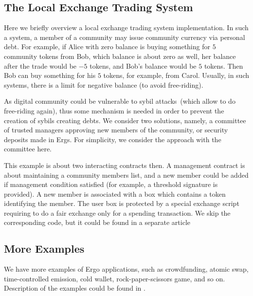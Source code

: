 
\subsection{The Local Exchange Trading System}
 \label{sec:platform}


 Here we briefly overview a local exchange trading system implementation. In such a system, a member of a community may
 issue community currency via personal debt. For example, if Alice with zero balance is buying something for $5$
 community tokens from Bob, which balance is about zero as well, her balance after the trade would be $-5$ tokens, and
 Bob's balance would be $5$ tokens. Then Bob can buy something for his $5$ tokens, for example, from Carol.
 Usually, in such systems, there is a limit for negative balance (to avoid free-riding).

 As digital community could be vulnerable to sybil attacks~(which allow to do free-riding again), thus some mechanism
 is needed in order to prevent the creation of sybils creating debts. We consider two solutions, namely, a committee of
 trusted managers approving new members of the community, or security deposits made in Ergs. For simplicity, we
 consider the approach with the committee here.

 This example is about two interacting contracts then. A management contract is about maintaining a
 community members list, and a new member could be added if management condition satisfied  (for example, a threshold
 signature is provided). A new member is associated with a box which contains a token identifying the member. The user
 box is protected by a special exchange script requiring to do a fair exchange only for a spending transaction.
 We skip the corresponding code, but it could be found in a separate article 

\subsection{More Examples}


 We have more examples of Ergo applications, such as crowdfunding, atomic swap, time-controlled emission,
 cold wallet, rock-paper-scissors game, and so on. Description of the examples could be found in \cite{ergoTutorial,
 ergoAdvTutorial}.
